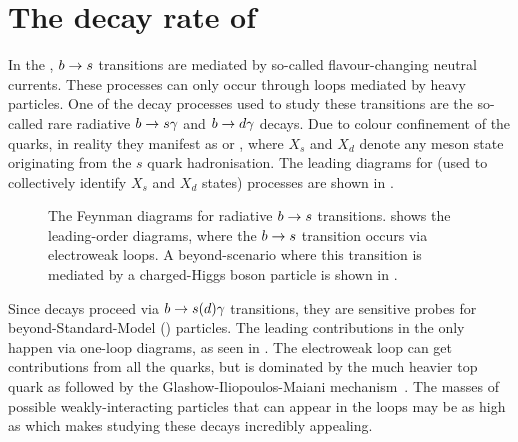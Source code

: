 \section{The decay rate of \texorpdfstring{\BtoXsdgamma}{B->Xsg}}\label{sec:btosgamma_totalrate_theory}

In the \SM, $b\rightarrow s$ transitions are mediated by so-called flavour-changing neutral currents.
These processes can only occur through loops mediated by heavy particles.
One of the decay processes used to study these transitions are the so-called rare radiative $b\rightarrow s\gamma$ and $b\rightarrow d\gamma$ decays.
Due to colour confinement of the quarks, in reality they manifest as \BtoXsgamma or \BtoXdgamma, where $X_s$ and $X_d$ denote any meson state originating from the $s$ quark hadronisation.
The leading \SM diagrams for \BtoXsdgamma (used to collectively identify $X_s$ and $X_d$ states) processes are shown in .

\begin{figure}[htbp!]
\resizebox{0.66\textwidth}{!}{
    \subcaptionbox{\label{fig:sm_diagrams}}{
        
        
    }
}
\resizebox{0.33\textwidth}{!}{
\subcaptionbox{\label{fig:bsm_diagrams}}{
    
}
}
\caption{\label{fig:b_to_s_gamma_diagrams}
The Feynman diagrams for radiative $b\rightarrow s$ transitions. 
 shows the leading-order \SM diagrams, where the $b\rightarrow s$ transition occurs via electroweak loops.
A beyond-\SM scenario where this transition is mediated by a charged-Higgs boson particle is shown in .
}
\end{figure}

Since \BtoXsdgamma decays proceed via $b\rightarrow s(d)\gamma$ transitions, they are sensitive probes for beyond-Standard-Model (\BSM) particles. 
The leading contributions in the \SM only happen via one-loop diagrams, as seen in .
The electroweak loop can get contributions from all the quarks, but is dominated by the much heavier top quark \cite{Mannel:2001vn} as followed by the Glashow-Iliopoulos-Maiani mechanism~\cite{Glashow:1970gm}. 
The masses of possible \BSM weakly-interacting particles that can appear in the loops may be as high as  \cite{Misiak:2020vlo} which makes studying these decays incredibly appealing.

